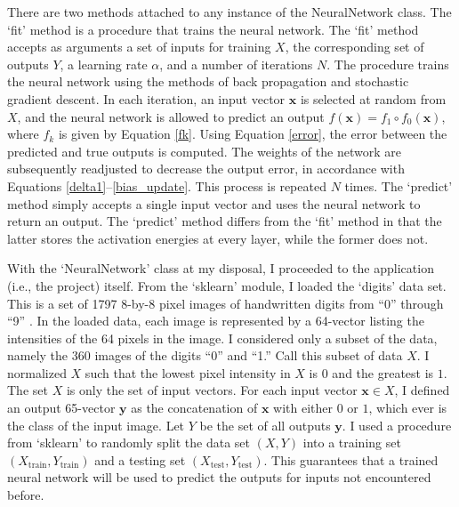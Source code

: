 \documentclass[12pt]{article}
\newcommand{\vecx}{\mathbf{x}}
\newcommand{\vecy}{\mathbf{y}}
\newcommand{\Xtrain}{X_{\text{train}}}
\newcommand{\Ytrain}{Y_{\text{train}}}
\newcommand{\Xtest}{X_{\text{test}}}
\newcommand{\Ytest}{Y_{\text{test}}}
\begin{document}
There are two methods attached to any instance of the NeuralNetwork class. The `fit' method is a procedure that trains the neural network. The `fit' method accepts as arguments a set of inputs for training $X$, the corresponding set of outputs $Y$, a learning rate $\alpha$, and a number of iterations $N$. The procedure trains the neural network using the methods of back propagation and stochastic gradient descent. In each iteration, an input vector $\vecx$ is selected at random from $X$, and the neural network is allowed to predict an output $f(\vecx) = f_1\circ f_0(\vecx)$, where $f_k$ is given by Equation \eqref{fk}. Using Equation \eqref{error}, the error between the predicted and true outputs is computed. The weights of the network are subsequently readjusted to decrease the output error, in accordance with Equations \eqref{delta1}--\eqref{bias_update}. This process is repeated $N$ times. The `predict' method simply accepts a single input vector and uses the neural network to return an output. The `predict' method differs from the `fit' method in that the latter stores the activation energies at every layer, while the former does not.

With the `NeuralNetwork' class at my disposal, I proceeded to the application (i.e., the project) itself. From the `sklearn' module, I loaded the `digits' data set. This is a set of 1797 8-by-8 pixel images of handwritten digits from ``0'' through ``9'' \cite{sklearn_digits}. In the loaded data, each image is represented by a 64-vector listing the intensities of the 64 pixels in the image. I considered only a subset of the data, namely the 360 images of the digits ``0'' and ``1.'' Call this subset of data $X$. I normalized $X$ such that the lowest pixel intensity in $X$ is $0$ and the greatest is $1$. The set $X$ is only the set of input vectors. For each input vector $\vecx \in X$, I defined an output 65-vector $\vecy$ as the concatenation of $\vecx$ with either $0$ or $1$, which ever is the class of the input image. Let $Y$ be the set of all outputs $\vecy$. I used a procedure from `sklearn' to randomly split the data set $(X, Y)$ into a training set $(\Xtrain, \Ytrain)$ and a testing set $(\Xtest, \Ytest)$. This guarantees that a trained neural network will be used to predict the outputs for inputs not encountered before.
\end{document}

